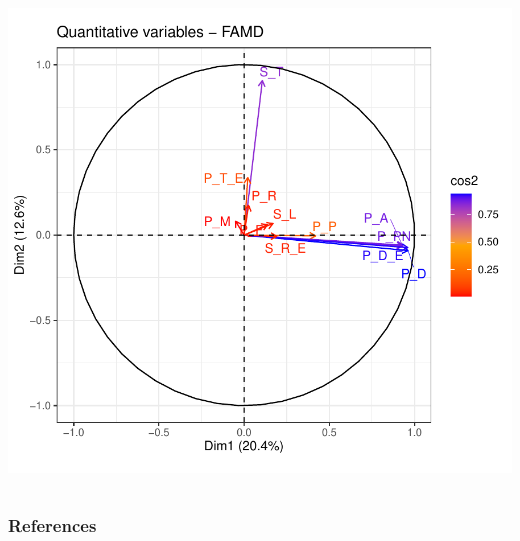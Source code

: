 \documentclass[compress]{beamer}
\begin{document}
\begin{frame}
\begin{columns}
\begin{center}
\includegraphics[width=0.7\linewidth]{Pic/FAMD_quantitative_variables.pdf}
\end{center}
\end{columns}
\end{frame}





\begin{frame}[t,allowframebreaks]
\frametitle{References}
\printbibliography
\end{frame}
\end{document}
